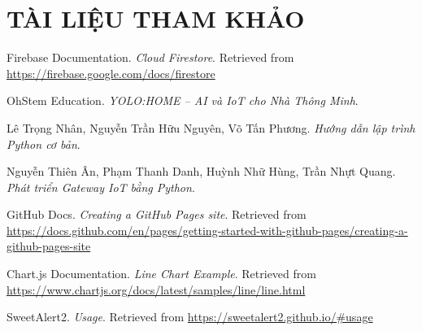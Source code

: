 \newpage
\section{TÀI LIỆU THAM KHẢO}


\begin{thebibliography}{99}

    Firebase Documentation.
    \textit{Cloud Firestore}. Retrieved from
    \url{https://firebase.google.com/docs/firestore}

    OhStem Education.
    \textit{YOLO:HOME – AI và IoT cho Nhà Thông Minh}.

    Lê Trọng Nhân, Nguyễn Trần Hữu Nguyên, Võ Tấn Phương.
    \textit{Hướng dẫn lập trình Python cơ bản}.

    Nguyễn Thiên Ân, Phạm Thanh Danh, Huỳnh Nhữ Hùng, Trần Nhựt Quang.
    \textit{Phát triển Gateway IoT bằng Python}.

    GitHub Docs.
    \textit{Creating a GitHub Pages site}. Retrieved from
    \url{https://docs.github.com/en/pages/getting-started-with-github-pages/creating-a-github-pages-site}

    Chart.js Documentation.
    \textit{Line Chart Example}. Retrieved from
    \url{https://www.chartjs.org/docs/latest/samples/line/line.html}

    SweetAlert2.
    \textit{Usage}. Retrieved from
    \url{https://sweetalert2.github.io/#usage}

\end{thebibliography}
